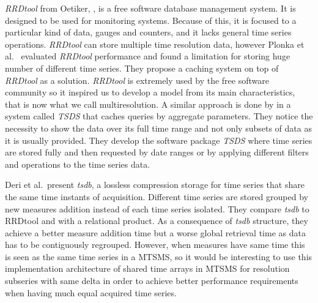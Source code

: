 \emph{RRDtool} from Oetiker, \cite{rrdtool,lisa98:oetiker}, is a free
software database management system. It is designed to be used for
monitoring systems. Because of this, it is focused to a particular
kind of data, gauges and counters, and it lacks general time series
operations. \emph{RRDtool} can store multiple time resolution data,
however Plonka et al.\ \cite{lisa07:plonka} evaluated \emph{RRDtool}
performance and found a limitation for storing huge number of
different time series. They propose a caching system on top of
\emph{RRDtool} as a solution.  \emph{RRDtool} is extremely used by the
free software community so it inspired us to develop a model from its
main characteristics, that is now what we call multiresolution. A
similar approach is done by \cite{weigel10} in a system called
\emph{TSDS} that caches queries by aggregate parameters. They notice
the necessity to show the data over its full time range and not only
subsets of data as it is usually provided.  They develop the software
package \emph{TSDS} where time series are stored fully and then
requested by date ranges or by applying different filters and
operations to the time series data.


Deri et al.\ present \emph{tsdb}, a lossless compression storage 
for time series that share the same time instants of
acquisition. Different time series are stored grouped by new measures
addition instead of each time series isolated.  They compare
\emph{tsdb} to RRDtool and with a relational product. As a consequence
of \emph{tsdb} structure, they achieve a better measure addition time
but a worse global retrieval time as data has to be contiguously
regrouped. However, when measures have same time this is seen as the
same time series in a MTSMS, so it would be interesting to use this
implementation architecture of shared time arrays in MTSMS for
resolution subseries with same delta in order to achieve better
performance requirements when having much equal acquired time series.



